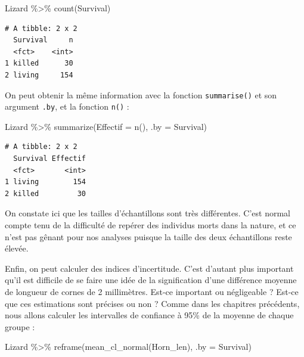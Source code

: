 \documentclass[
  a4paper,
  DIV=11,
  numbers=noendperiod,
  oneside]{scrreprt}
\newenvironment{Shaded}{}{}
\newcommand{\AttributeTok}[1]{\textcolor[rgb]{0.84,0.23,0.29}{#1}}
\newcommand{\FunctionTok}[1]{\textcolor[rgb]{0.44,0.26,0.76}{#1}}
\newcommand{\NormalTok}[1]{\textcolor[rgb]{0.14,0.16,0.18}{#1}}
\newcommand{\SpecialCharTok}[1]{\textcolor[rgb]{0.00,0.36,0.77}{#1}}
\begin{document}
\begin{Shaded}
\begin{Highlighting}[]
\NormalTok{Lizard }\SpecialCharTok{\%\textgreater{}\%}
  \FunctionTok{count}\NormalTok{(Survival)}
\end{Highlighting}
\end{Shaded}

\begin{verbatim}
# A tibble: 2 x 2
  Survival     n
  <fct>    <int>
1 killed      30
2 living     154
\end{verbatim}

On peut obtenir la même information avec la fonction
\texttt{summarise()} et son argument \texttt{.by}, et la fonction
\texttt{n()} :

\begin{Shaded}
\begin{Highlighting}[]
\NormalTok{Lizard }\SpecialCharTok{\%\textgreater{}\%} 
  \FunctionTok{summarize}\NormalTok{(}\AttributeTok{Effectif =} \FunctionTok{n}\NormalTok{(), }\AttributeTok{.by =}\NormalTok{ Survival)}
\end{Highlighting}
\end{Shaded}

\begin{verbatim}
# A tibble: 2 x 2
  Survival Effectif
  <fct>       <int>
1 living        154
2 killed         30
\end{verbatim}

On constate ici que les tailles d'échantillons sont très différentes.
C'est normal compte tenu de la difficulté de repérer des individus morts
dans la nature, et ce n'est pas gênant pour nos analyses puisque la
taille des deux échantillons reste élevée.

Enfin, on peut calculer des indices d'incertitude. C'est d'autant plus
important qu'il est difficile de se faire une idée de la signification
d'une différence moyenne de longueur de cornes de 2 millimètres. Est-ce
important ou négligeable ? Est-ce que ces estimations sont précises ou
non ? Comme dans les chapitres précédents, nous allons calculer les
intervalles de confiance à 95\% de la moyenne de chaque groupe :

\begin{Shaded}
\begin{Highlighting}[]
\NormalTok{Lizard }\SpecialCharTok{\%\textgreater{}\%} 
  \FunctionTok{reframe}\NormalTok{(}\FunctionTok{mean\_cl\_normal}\NormalTok{(Horn\_len), }\AttributeTok{.by =}\NormalTok{ Survival)}
\end{Highlighting}
\end{Shaded}
\end{document}
